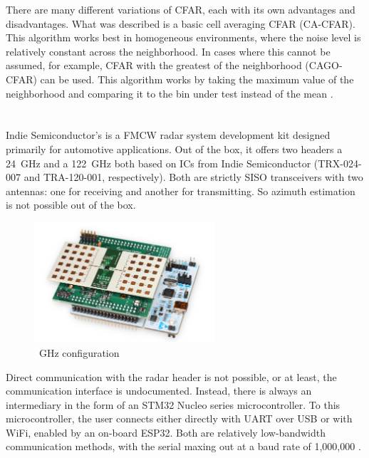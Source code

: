 There are many different variations of CFAR, each with its own advantages and disadvantages.
What was described is a basic cell averaging CFAR (CA-CFAR).
This algorithm works best in homogeneous environments, where the noise level is relatively constant across the neighborhood.
In cases where this cannot be assumed, for example, CFAR with the greatest of the neighborhood (CAGO-CFAR) can be used.
This algorithm works by taking the maximum value of the neighborhood and comparing it to the bin under test instead of the mean \cite{rohling1983}.

\chapter{\sidar}

Indie Semiconductor's \sidar is a FMCW radar system development kit designed primarily for automotive applications.
Out of the box, it offers two headers a 24~GHz and a 122~GHz both based on ICs from Indie Semiconductor (TRX-024-007 and TRA-120-001, respectively).
Both are strictly SISO transceivers with two antennas: one for receiving and another for transmitting.
So azimuth estimation is not possible out of the box.

\begin{figure}[h!]
  \centering
  \includegraphics[width=0.6\textwidth]{../img/sidar.png}

  \caption[~GHz configuration \cite{sidarMANOld}]{~GHz configuration \cite{sidarMANOld}}
  \label{fig:sidar}
\end{figure}

Direct communication with the radar header is not possible, or at least, the communication interface is undocumented.
Instead, there is always an intermediary in the form of an STM32 Nucleo series microcontroller.
To this microcontroller, the user connects either directly with UART over USB or with WiFi, enabled by an on-board ESP32.
Both are relatively low-bandwidth communication methods, with the serial maxing out at a baud rate of 1,000,000 \cite{sidarMAN}.

